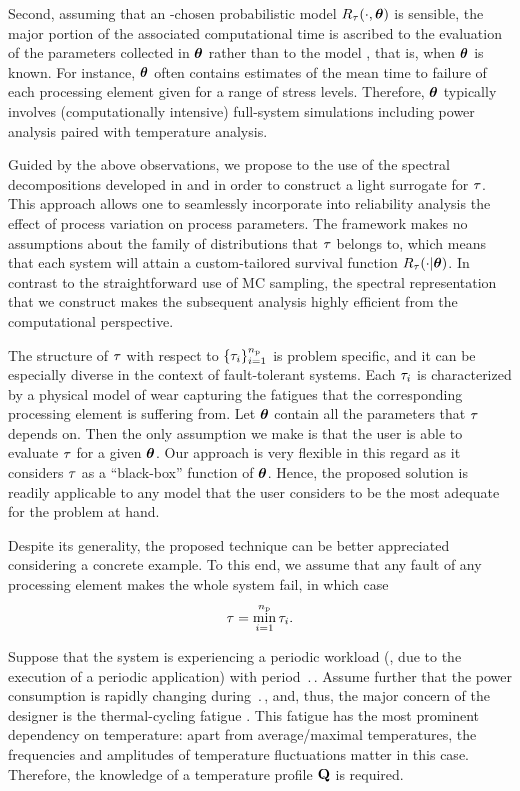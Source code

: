 Second, assuming that an \apriori-chosen probabilistic model $R_\tau(\cdot, \bm{\theta})$ is sensible, the major portion of the associated computational time is ascribed to the evaluation of the parameters collected in $\bm{\theta}$ rather than to the model \perse, that is, when $\bm{\theta}$ is known.
For instance, $\bm{\theta}$ often contains estimates of the mean time to failure of each processing element given for a range of stress levels.
Therefore, $\bm{\theta}$ typically involves (computationally intensive) full-system simulations including power analysis paired with temperature analysis.

Guided by the above observations, we propose to the use of the spectral decompositions developed in  and  in order to construct a light surrogate for $\tau$.
This approach allows one to seamlessly incorporate into reliability analysis the effect of process variation on process parameters.
The framework makes no assumptions about the family of distributions that $\tau$ belongs to, which means that each system will attain a custom-tailored survival function $R_\tau(\cdot | \bm{\theta})$.
In contrast to the straightforward use of MC sampling, the spectral representation that we construct makes the subsequent analysis highly efficient from the computational perspective.

The structure of $\tau$ with respect to $\{ \tau_i \}_{i = 1}^{n_\text{p}}$ is problem specific, and it can be especially diverse in the context of fault-tolerant systems.
Each $\tau_i$ is characterized by a physical model of wear \cite{jedec2011} capturing the fatigues that the corresponding processing element is suffering from.
Let $\bm{\theta}$ contain all the parameters that $\tau$ depends on.
Then the only assumption we make is that the user is able to evaluate $\tau$ for a given $\bm{\theta}$.
Our approach is very flexible in this regard as it considers $\tau$ as a ``black-box'' function of $\bm{\theta}$.
Hence, the proposed solution is readily applicable to any model that the user considers to be the most adequate for the problem at hand.

Despite its generality, the proposed technique can be better appreciated considering a concrete example.
To this end, we assume that any fault of any processing element makes the whole system fail, in which case
\[
  \tau = \min_{i = 1}^{n_\text{p}} \tau_i.
\]

Suppose that the system is experiencing a periodic workload (\eg, due to the execution of a periodic application) with period $\period$.
Assume further that the power consumption is rapidly changing during $\period$, and, thus, the major concern of the designer is the thermal-cycling fatigue \cite{jedec2011}.
This fatigue has the most prominent dependency on temperature: apart from average/maximal temperatures, the frequencies and amplitudes of temperature fluctuations matter in this case.
Therefore, the knowledge of a temperature profile $\mathbf{Q}$ is required.


